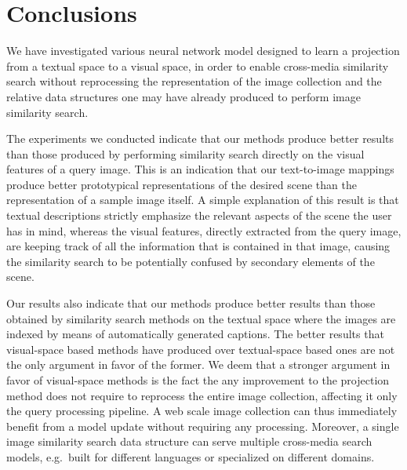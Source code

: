 \section{Conclusions}
\label{sec:t2v:conclusions}

We have investigated various neural network model designed to learn a projection from a textual space to a visual space, in order to enable cross-media similarity search without reprocessing the representation of the image collection and the relative data structures one may have already produced to perform image similarity search.

The experiments we conducted indicate that our methods produce better results than those produced by performing similarity search directly on the visual features of a query image.
This is an indication that our text-to-image mappings produce better prototypical representations of the desired scene than the representation of a sample image itself.
A simple explanation of this result is that textual descriptions strictly emphasize the relevant aspects of the scene the user has in mind, whereas the visual features, directly extracted from the query image, are keeping track of all the information that is contained in that image, causing the similarity search to be potentially confused by secondary elements of the scene.

Our results also indicate that our methods produce better results than those obtained by similarity search methods on the textual space where the images are indexed by means of automatically generated captions.
The better results that visual-space based methods have produced over textual-space based ones are not the only argument in favor of the former.
We deem that a stronger argument in favor of visual-space methods is the fact the any improvement to the projection method does not require to reprocess the entire image collection, affecting it only the query processing pipeline.
A web scale image collection can thus immediately benefit from a model update without requiring any processing.
Moreover, a single image similarity search data structure can serve multiple cross-media search models, e.g.\ built for different languages or specialized on different domains.

